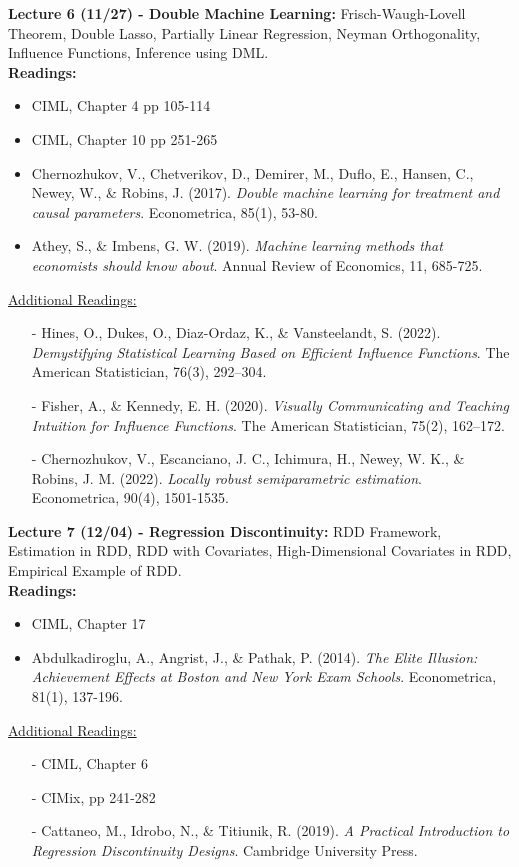 \documentclass[12pt]{article}
\begin{document}
\textbf{Lecture 6 (11/27) - Double Machine Learning:} Frisch-Waugh-Lovell Theorem, Double Lasso, Partially Linear Regression, Neyman Orthogonality, Influence Functions, Inference using DML.\\
\textbf{Readings:}
\begin{itemize}
    \item CIML, Chapter 4 pp 105-114
    \item CIML, Chapter 10 pp 251-265
    \item Chernozhukov, V., Chetverikov, D., Demirer, M., Duflo, E., Hansen, C., Newey, W., \& Robins, J. (2017). \emph{Double machine learning for treatment and causal parameters}. Econometrica, 85(1), 53-80.
    \item Athey, S., \& Imbens, G. W. (2019). \emph{Machine learning methods that economists should know about}. Annual Review of Economics, 11, 685-725.
\end{itemize}
\underline{Additional Readings:}
\begin{itemize}
    \item[-] Hines, O., Dukes, O., Diaz-Ordaz, K., \& Vansteelandt, S. (2022). \emph{Demystifying Statistical Learning Based on Efficient Influence Functions}. The American Statistician, 76(3), 292–304.
    \item[-] Fisher, A., \& Kennedy, E. H. (2020). \emph{Visually Communicating and Teaching Intuition for Influence Functions}. The American Statistician, 75(2), 162–172.
    \item[-] Chernozhukov, V., Escanciano, J. C., Ichimura, H., Newey, W. K., \& Robins, J. M. (2022). \emph{Locally robust semiparametric estimation}. Econometrica, 90(4), 1501-1535.
\end{itemize}

\textbf{Lecture 7 (12/04) - Regression Discontinuity:} RDD Framework, Estimation in RDD, RDD with Covariates, High-Dimensional Covariates in RDD, Empirical Example of RDD.\\
\textbf{Readings:}
\begin{itemize}
    \item CIML, Chapter 17
    \item Abdulkadiroglu, A., Angrist, J., \& Pathak, P. (2014). \emph{The Elite Illusion: Achievement Effects at Boston and New York Exam Schools}. Econometrica, 81(1), 137-196.
\end{itemize}
\underline{Additional Readings:}
\begin{itemize}
    \item[-] CIML, Chapter 6
    \item[-] CIMix, pp 241-282
    \item[-] Cattaneo, M., Idrobo, N., \& Titiunik, R. (2019). \emph{A Practical Introduction to Regression Discontinuity Designs}. Cambridge University Press.
\end{itemize}
\end{document}
